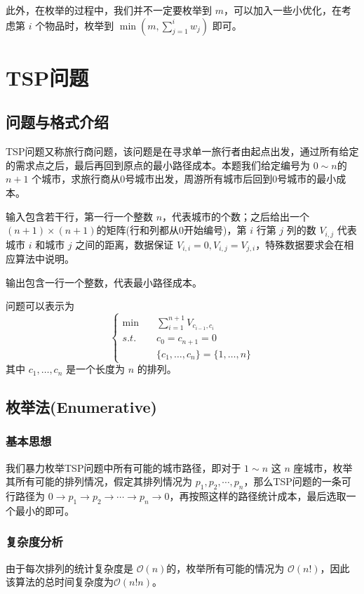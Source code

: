\documentclass[lang=cn,11pt,a4paper]{elegantpaper}
\newcommand{\subject}{s.t.}
\begin{document}
此外，在枚举的过程中，我们并不一定要枚举到 $m$，可以加入一些小优化，在考虑第 $i$ 个物品时，枚举到 $\min\left(m,\sum_{j=1}^{i}w_j\right)$ 即可。


\section{TSP问题}
\subsection{问题与格式介绍}
TSP问题又称旅行商问题，该问题是在寻求单一旅行者由起点出发，通过所有给定的需求点之后，最后再回到原点的最小路径成本。本题我们给定编号为 $0 \sim n$的 $n+1$ 个城市，求旅行商从0号城市出发，周游所有城市后回到0号城市的最小成本。

输入包含若干行，第一行一个整数 $n$，代表城市的个数；之后给出一个 $(n+1) \times (n+1)$的矩阵(行和列都从0开始编号)，第 $i$ 行第 $j$ 列的数 $V_{i,j}$ 代表城市 $i$ 和城市 $j$ 之间的距离，数据保证 $V_{i,i}=0,V_{i,j}=V_{j,i}$，特殊数据要求会在相应算法中说明。

输出包含一行一个整数，代表最小路径成本。

问题可以表示为
\begin{equation}
	\begin{cases}
		\min \quad &\sum_{i = 1}^{n + 1} V_{c_{i - 1}, c_{i}}\\
		\subject &c_0 = c_{n + 1} = 0\\
		&\{c_1, \dots, c_n\} = \{1, \dots, n\}
	\end{cases}
\end{equation}
其中 $c_1, \dots, c_n$ 是一个长度为 $n$ 的排列。

\subsection{枚举法(Enumerative)}
\subsubsection{基本思想}
我们暴力枚举TSP问题中所有可能的城市路径，即对于 $1 \sim n$ 这 $n$ 座城市，枚举其所有可能的排列情况，假定其排列情况为 $p_1,p_2,\cdots,p_n$，那么TSP问题的一条可行路径为 $0\rightarrow p_1\rightarrow p_2\rightarrow\cdots\rightarrow p_n\rightarrow0$，再按照这样的路径统计成本，最后选取一个最小的即可。

\subsubsection{复杂度分析}
由于每次排列的统计复杂度是 $\mathcal{O}\left(n\right)$的，枚举所有可能的情况为 $\mathcal{O}\left(n!\right)$，因此该算法的总时间复杂度为$\mathcal{O}\left(n!n\right)$。
\end{document}
